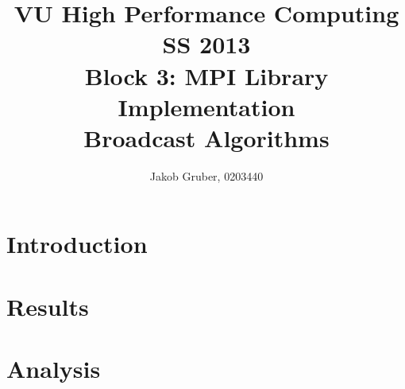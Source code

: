 \documentclass[a4paper,10pt]{article}
\title{VU High Performance Computing \\
       SS 2013 \\
       Block 3: MPI Library Implementation \\
       Broadcast Algorithms}
\author{Jakob Gruber, 0203440}
\begin{document}
\maketitle
\tableofcontents
\pagebreak

\section{Introduction} \label{section:introduction}

\section{Results}

\section{Analysis}
\end{document}
